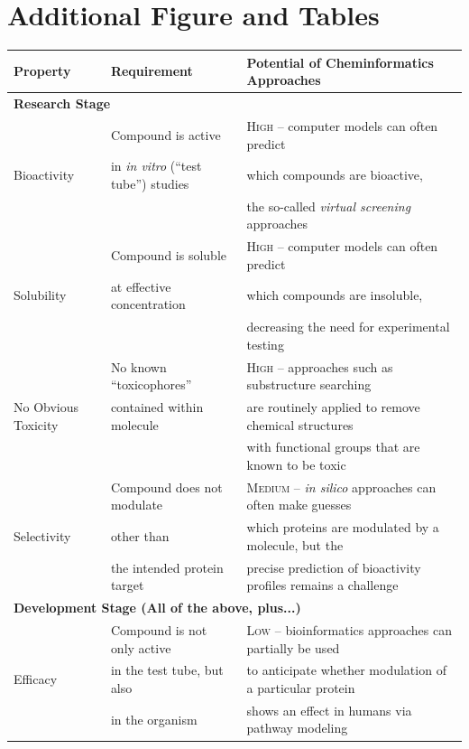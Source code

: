 \documentclass{../sig-alternate}
\begin{document}
\section{Additional Figure and Tables}
%
\begin{table}
\begin{tabular}{|l|l|l|} \hline
\textbf{Property} & \textbf{Requirement} & \textbf{Potential of Cheminformatics Approaches} \\ \hline
\multicolumn{3}{|l|}{\textbf{Research Stage}} \\ \hline
\multirow{3}{*}{Bioactivity} & Compound is active & \textsc{High} -- computer models can often predict \\
& in \emph{in vitro} (``test tube'')
studies &  which compounds are bioactive, \\
&& the so-called \emph{virtual screening} approaches \\ \hline
\multirow{3}{*}{Solubility} & Compound is soluble  & \textsc{High} -- computer models can often predict \\
& at effective concentration & which compounds are insoluble, \\
&& decreasing the need for experimental testing \\ \hline
\multirow{3}{*}{No Obvious Toxicity} & No known ``toxicophores''  & \textsc{High} -- approaches such as substructure
searching \\
& contained within molecule & are routinely applied to remove
chemical structures \\
&& with functional groups that
are known to be toxic \\ \hline
\multirow{3}{*}{Selectivity} & Compound does not modulate  & \textsc{Medium} -- \emph{in silico} approaches can often make
guesses  \\
& other than  & which proteins are modulated by a
molecule, but the \\
& the intended protein
target & precise prediction of
bioactivity profiles remains a challenge \\ \hline
\multicolumn{3}{|l|}{\textbf{Development Stage (All of the above, plus...)}} \\ \hline
\multirow{3}{*}{Efficacy} & Compound is not only
active
& \textsc{Low} -- bioinformatics approaches can partially
be used  \\
 & in the test tube, but also & to anticipate whether modulation of a
particular protein  \\
in Animal/Human Models & in the
organism  & shows an effect in humans via pathway modeling\\ \hline

\end{tabular}
\end{table}
\end{document}
